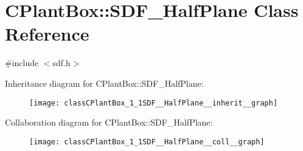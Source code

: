 \hypertarget{classCPlantBox_1_1SDF__HalfPlane}{}\section{C\+Plant\+Box\+:\+:S\+D\+F\+\_\+\+Half\+Plane Class Reference}
\label{classCPlantBox_1_1SDF__HalfPlane}


{\ttfamily \#include $<$sdf.\+h$>$}



Inheritance diagram for C\+Plant\+Box\+:\+:S\+D\+F\+\_\+\+Half\+Plane\+:\nopagebreak
\begin{figure}[H]
\begin{center}
\leavevmode
\texttt{[image: classCPlantBox\_1\_1SDF\_\_HalfPlane\_\_inherit\_\_graph]}
\end{center}
\end{figure}


Collaboration diagram for C\+Plant\+Box\+:\+:S\+D\+F\+\_\+\+Half\+Plane\+:\nopagebreak
\begin{figure}[H]
\begin{center}
\leavevmode
\texttt{[image: classCPlantBox\_1\_1SDF\_\_HalfPlane\_\_coll\_\_graph]}
\end{center}
\end{figure}

